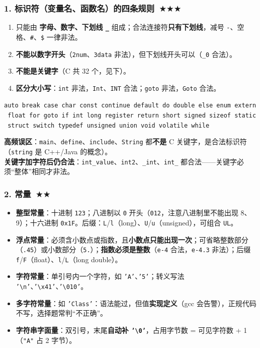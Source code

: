 \documentclass[UTF8,zihao=-4,a4paper]{ctexart}
\newcommand{\cstar}{\textcolor{deepred}{$\bigstar$}}
\begin{document}
\subsubsection*{1. 标识符（变量名、函数名）的四条规则\ \cstar\cstar\cstar}
\begin{enumerate}
  \item 只能由 \textbf{字母、数字、下划线 \texttt{\_} } 组成；合法连接符\textbf{只有下划线}，减号 \texttt{-}、空格、\texttt{\#}、\texttt{\$} 一律非法。
  \item \textbf{不能以数字开头}（\texttt{2num}、\texttt{3data} 非法），但下划线开头可以（\texttt{\_0} 合法）。
  \item \textbf{不能是关键字}（C 共 32 个，见下）。
  \item \textbf{区分大小写}：\texttt{int} 非法，\texttt{Int}、\texttt{INT} 合法；\texttt{goto} 非法，\texttt{Goto} 合法。
\end{enumerate}

\begin{keybox}
\texttt{auto\ break\ case\ char\ const\ continue\ default\ do\ double\ else\ enum\ extern\ float\ for\ goto\ if\ int\ long\ register\ return\ short\ signed\ sizeof\ static\ struct\ switch\ typedef\ unsigned\ union\ void\ volatile\ while}

\vspace{3pt}
\textbf{高频误区}：\texttt{main}、\texttt{define}、\texttt{include}、\texttt{String} 都\textbf{不是} C 关键字，是合法标识符（\texttt{string} 是 C++/Java 的概念）。\\
\textbf{关键字加字符后仍合法}：\texttt{int\_value}、\texttt{int2}、\texttt{\_int}、\texttt{int\_} 都合法——关键字必须“整体”相同才非法。
\end{keybox}

\subsubsection*{2. 常量\ \cstar\cstar}
\begin{itemize}
  \item \textbf{整型常量}：十进制 \texttt{123}；八进制以 \texttt{0} 开头（\texttt{012}，注意八进制里不能出现 8、9）；十六进制 \texttt{0x1F}。后缀：\texttt{L}/\texttt{l}（long）、\texttt{U}/\texttt{u}（unsigned），可组合 \texttt{UL}。
  \item \textbf{浮点常量}：必须含小数点或指数，且\textbf{小数点只能出现一次}；可省略整数部分（\texttt{.45}）或小数部分（\texttt{5.}）；\textbf{指数必须是整数}（\texttt{e-4} 合法，\texttt{e-4.3} 非法）；后缀 \texttt{f}/\texttt{F}（float）、\texttt{l}/\texttt{L}（long double）。
  \item \textbf{字符常量}：单引号内一个字符，如 \texttt{'A'}、\texttt{'5'}；转义写法 \texttt{'\textbackslash n'}、\texttt{'\textbackslash x41'}、\texttt{'\textbackslash 010'}。
  \item \textbf{多字符常量}：如 \texttt{'Class'}：语法能过，但值\textbf{实现定义}（gcc 会告警），正规代码不写，选择题常判“不正确”。
  \item \textbf{字符串字面量}：双引号，末尾\textbf{自动补 \texttt{'\textbackslash 0'}}，占用字节数 = 可见字符数 + 1（\texttt{"A"} 占 2 字节）。
\end{itemize}
\end{document}
